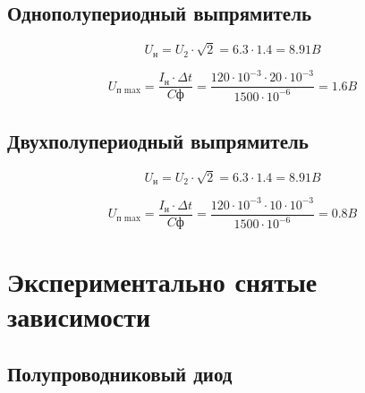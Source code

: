 \subsection{Однополупериодный выпрямитель}

\begin{displaymath}
U_\text{н} = U_2 \cdot \sqrt{2} = 6.3 \cdot 1.4 = 8.91 B
\end{displaymath}

\begin{displaymath}
U_\text{п max} = \frac{I_\text{н} \cdot \Delta t}{C\text{ф}} = \frac{120 \cdot 10^{-3}\cdot 20 \cdot 10^{-3}}{1500 \cdot 10^{-6}} = 1.6 B
\end{displaymath}

\subsection{Двухполупериодный выпрямитель}

\begin{displaymath}
U_\text{н} = U_2 \cdot \sqrt{2} = 6.3 \cdot 1.4 = 8.91 B
\end{displaymath}

\begin{displaymath}
U_\text{п max} = \frac{I_\text{н} \cdot \Delta t}{C\text{ф}} = \frac{120 \cdot 10^{-3}\cdot 10 \cdot 10^{-3}}{1500 \cdot 10^{-6}} = 0.8 B
\end{displaymath}

\section{Экспериментально снятые зависимости}

\subsection{Полупроводниковый диод}


